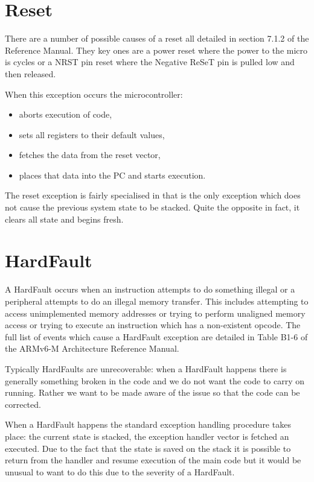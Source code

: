 \section{Reset}
There are a number of possible causes of a reset all detailed in section 7.1.2 of the Reference Manual. They key ones are a power reset where the power to the micro is cycles or a NRST pin reset where the Negative ReSeT pin is pulled low and then released. 

When this exception occurs the microcontroller:
\begin{itemize}
    \item aborts execution of code, 
    \item sets all registers to their default values,
    \item fetches the data from the reset vector,
    \item places that data into the PC and starts execution. 
\end{itemize}

The reset exception is fairly specialised in that is the only exception which does not cause the previous system state to be stacked. Quite the opposite in fact, it clears all state and begins fresh. 

\section{HardFault}
A HardFault occurs when an instruction attempts to do something illegal or a peripheral attempts to do an illegal memory transfer. This includes attempting to access unimplemented memory addresses or trying to perform unaligned memory access or trying to execute an instruction which has a non-existent opcode. The full list of events which cause a HardFault exception are detailed in Table B1-6 of the ARMv6-M Architecture Reference Manual.

Typically HardFaults are unrecoverable: when a HardFault happens there is generally something broken in the code and we do not want the code to carry on running. Rather we want to be made aware of the issue so that the code can be corrected. 

When a HardFault happens the standard exception handling procedure takes place: the current state is stacked, the exception handler vector is fetched an executed. Due to the fact that the state is saved on the stack it is possible to return from the handler and resume execution of the main code but it would be unusual to want to do this due to the severity of a HardFault.


